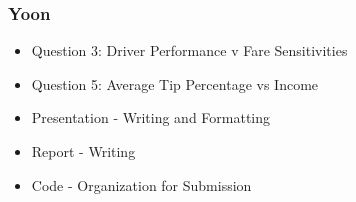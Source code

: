 \documentclass[twoside]{article}
\begin{document}
\begin{multicols}{2}
\subsubsection*{Yoon}
\begin{itemize}
  \item Question 3: Driver Performance v Fare Sensitivities
  \item Question 5: Average Tip Percentage vs Income
  \item Presentation - Writing and Formatting
  \item Report - Writing
  \item Code - Organization for Submission
\end{itemize}


\end{multicols}
\end{document}
